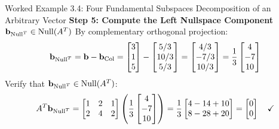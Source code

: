\begin{examplebox}{Worked Example 3.4: Four Fundamental Subspaces Decomposition of an Arbitrary Vector}
\textbf{Step 5: Compute the Left Nullspace Component $\mathbf{b}_{\operatorname{Null}^T} \in \operatorname{Null}(A^T)$}
By complementary orthogonal projection:
\begin{equation*}
\mathbf{b}_{\operatorname{Null}^T} = \mathbf{b} - \mathbf{b}_{\operatorname{Col}} = \begin{bmatrix} 3 \\ 1 \\ 5 \end{bmatrix} - \begin{bmatrix} 5/3 \\ 10/3 \\ 5/3 \end{bmatrix} = \begin{bmatrix} 4/3 \\ -7/3 \\ 10/3 \end{bmatrix} = \frac{1}{3} \begin{bmatrix} 4 \\ -7 \\ 10 \end{bmatrix}
\end{equation*}
Verify that $\mathbf{b}_{\operatorname{Null}^T} \in \operatorname{Null}(A^T)$:
\begin{equation*}
A^T \mathbf{b}_{\operatorname{Null}^T} = \begin{bmatrix} 1 & 2 & 1 \\ 2 & 4 & 2 \end{bmatrix} \left( \frac{1}{3}\begin{bmatrix} 4 \\ -7 \\ 10 \end{bmatrix} \right) = \frac{1}{3} \begin{bmatrix} 4 - 14 + 10 \\ 8 - 28 + 20 \end{bmatrix} = \begin{bmatrix} 0 \\ 0 \end{bmatrix} \quad \checkmark
\end{equation*}


\end{examplebox}
